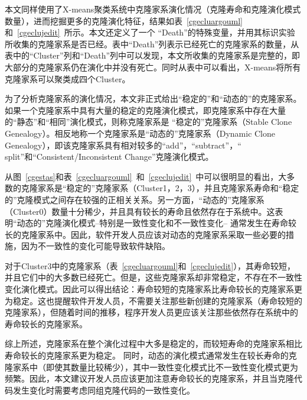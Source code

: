 本文同样使用了X-means聚类系统中克隆家系演化情况（克隆寿命和克隆演化模式数量），进而挖掘更多的克隆演化特征，结果如表~\ref{cgecluargouml}和~\ref{cgeclujedit}~所示。本文还定义了一个 “Death”的特殊变量，并用其标识实验所收集的克隆家系是否已经。表中“Death”列表示已经死亡的克隆家系的数量，从表中的“Cluster”列和“Death”列中可以发现，本文所收集的克隆家系是完整的，即大部分的克隆家系仍在演化中并没有死亡。同时从表中可以看出，X-means将所有克隆家系可以聚类成四个Cluster。

为了分析克隆家系的演化情况，本文非正式给出“稳定的”和“动态的”的克隆家系。如果一个克隆家系中具有大量的稳定的克隆演化模式，即克隆家系中存在大量的“静态”和“相同”演化模式，则称克隆家系是 “稳定的”克隆家系（Stable Clone Genealogy）。相反地称一个克隆家系是“动态的”克隆家系（Dynamic Clone Genealogy），即该克隆家系具有相对较多的“add”，“subtract”，“ split”和“Consistent/Inconsistent Change”克隆演化模式。

从图~\ref{cgestas}和表~\ref{cgecluargouml}~和~\ref{cgeclujedit}~中可以很明显的看出，大多数的克隆家系是“稳定的”克隆家系（Cluster1，2，3），并且克隆家系寿命和“稳定的”克隆模式之间存在较强的正相关关系。另一方面，“动态的”克隆家系（Cluster0）数量十分稀少，并且具有较长的寿命且依然存在于系统中。这表明“动态的”克隆演化模式--特别是一致性变化和不一致性变化-- 通常发生在寿命较长的克隆家系中。因此，软件开发人员应该对动态的克隆家系采取一些必要的措施，因为不一致性的变化可能导致软件缺陷。

对于Cluster3中的克隆家系（表~\ref{cgecluargouml}和~\ref{cgeclujedit}），其寿命较短，并且它们中的大多数已经死亡。但是，这些克隆家系却非常稳定，不存在不一致性变化演化模式。因此可以得出结论：寿命较短的克隆家系比寿命较长的克隆家系更为稳定。这也提醒软件开发人员，不需要关注那些新创建的克隆家系（寿命较短的克隆家系），但随着时间的推移，程序开发人员更应该关注那些依然存在系统中的寿命较长的克隆家系。

综上所述，克隆家系在整个演化过程中大多是稳定的，而较短寿命的克隆家系相比寿命较长的克隆家系更为稳定。 同时，动态的演化模式通常发生在较长寿命的克隆家系中（即使其数量比较稀少），其中一致性变化模式比不一致性变化模式更为频繁。因此，本文建议开发人员应该更加注意寿命较长的克隆家系，并且当克隆代码发生变化时需要考虑同组克隆代码的一致性变化。
 
 


